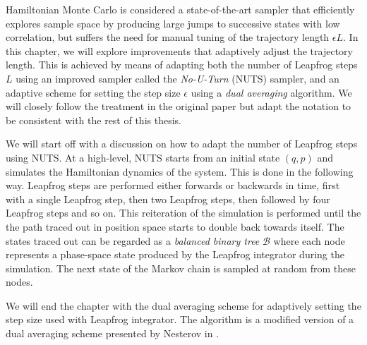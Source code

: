 Hamiltonian Monte Carlo is considered a state-of-the-art sampler that efficiently explores sample space by producing large jumps to successive states with low correlation, 
but suffers the need for manual tuning of the trajectory length $\epsilon L$. 
In this chapter, we will explore improvements that adaptively adjust the trajectory length. This is achieved by means of adapting both the number of Leapfrog steps $L$ using an improved sampler called the \textit{No-U-Turn} (NUTS) sampler, and an adaptive scheme for setting the step size $\epsilon$ using a \textit{dual averaging} algorithm. We will closely follow the treatment in the original paper \cite{nuts} but adapt the notation to be consistent with the rest of this thesis.

We will start off with a discussion on how to adapt the number of Leapfrog steps using NUTS. At a high-level, NUTS starts from an initial state $(q, p)$ and simulates the Hamiltonian dynamics of the system. This is
done in the following way. Leapfrog steps are performed either forwards or backwards in time, first with a single Leapfrog step, then two Leapfrog steps, then followed by four Leapfrog steps and so on. This reiteration of the simulation is performed until the the path traced out in position space starts to double back towards itself. The states traced out can be regarded as a \textit{balanced binary tree} $\mathcal{B}$ where
each node represents a phase-space state produced by the Leapfrog integrator during the simulation. The next state of the Markov chain is sampled at random from these nodes.  

We will end the chapter with the dual averaging scheme for adaptively setting the step size used with Leapfrog integrator. The algorithm is a modified version of a dual averaging scheme presented by Nesterov in \cite{Nesterov2009}.



